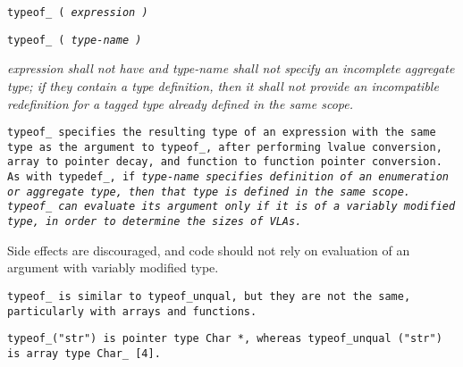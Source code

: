 
\tt{typeof\_ (} \it{expression} \tt{)}

\tt{typeof\_ (} \it{type-name}  \tt{)}


\it{expression} shall not have and \it{type-name} shall not specify an incomplete
aggregate type; if they contain a type definition, then it shall not provide an
incompatible redefinition for a tagged type already defined in the same scope.


\tt{typeof_} specifies the resulting type of an expression with the same type
as the argument to \tt{typeof_}, after performing lvalue conversion,
array to pointer decay, and function to function pointer conversion.
As with \tt{typedef_}, if \it{type-name} specifies definition of an
enumeration or aggregate type, then that type is defined in the same scope.
\tt{typeof_} can evaluate its argument only if it is of a
variably modified type, in order to determine the sizes of VLAs.


Side effects are discouraged, and code should not rely
on evaluation of an argument with variably modified type.

\note \tt{typeof_} is similar to \tt{typeof_unqual}, but they are not the same,
particularly with arrays and functions.

\example \tt{typeof_("str")} is pointer type \tt{Char *},
whereas \tt{typeof_unqual ("str")} is array type \tt{Char_ [4]}.
